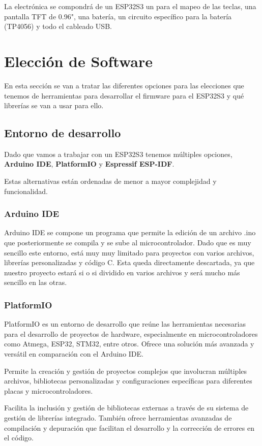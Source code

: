 La electrónica se compondrá de un ESP32S3 un  para el mapeo de las teclas, una pantalla \gls{TFT} de 0.96", una batería, un circuito específico para la batería (TP4056) y todo el cableado USB.
\newpage

\section{Elección de Software}
En esta sección se van a tratar las diferentes opciones para las elecciones que tenemos de herramientas para desarrollar el firmware para el ESP32S3 y qué librerías se van a usar para ello.

\subsection{Entorno de desarrollo}
Dado que vamos a trabajar con un ESP32S3 tenemos múltiples opciones, \textbf{Arduino IDE}, \textbf{PlatformIO} y \textbf{Espressif ESP-IDF}.

Estas alternativas están ordenadas de menor a mayor complejidad y funcionalidad.
\subsubsection{Arduino IDE}
Arduino IDE se compone un programa que permite la edición de un archivo .ino que posteriormente se compila y se sube al microcontrolador. Dado que es muy sencillo este entorno, está muy muy limitado para proyectos con varios archivos, librerías personalizadas y código C. Esta queda directamente descartada, ya que nuestro proyecto estará si o si dividido en varios archivos y será mucho más sencillo en las otras.

\subsubsection{PlatformIO}
PlatformIO es un entorno de desarrollo que reúne las herramientas necesarias para el desarrollo de proyectos de hardware, especialmente en microcontroladores como Atmega, ESP32, STM32, entre otros. Ofrece una solución más avanzada y versátil en comparación con el Arduino IDE.

Permite la creación y gestión de proyectos complejos que involucran múltiples archivos, bibliotecas personalizadas y configuraciones específicas para diferentes placas y microcontroladores.

Facilita la inclusión y gestión de bibliotecas externas a través de su sistema de gestión de librerías integrado. También ofrece herramientas avanzadas de compilación y depuración que facilitan el desarrollo y la corrección de errores en el código.

